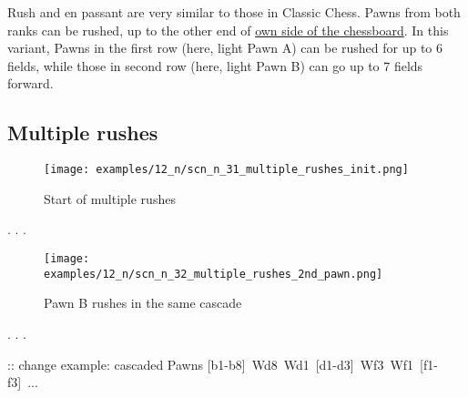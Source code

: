 Rush and en passant are very similar to those in Classic Chess.\newline
\indent
Pawns from both ranks can be rushed, up to the other end of
\hyperref[sec:Definitions/Chessboard sides, navigation]{own side of the chessboard}.\newline
\indent
In this variant, Pawns in the first row (here, light Pawn A) can be rushed for up
to 6 fields, while those in second row (here, light Pawn B) can go up to 7 fields
forward.

\clearpage %

\subsection*{Multiple rushes}
\label{sec:Nineteen/Rush, en passant/Multiple rushes}

\vspace*{-1.4\baselineskip}
\noindent
\begin{figure}[!h]
\texttt{[image: examples/12\_n/scn\_n\_31\_multiple\_rushes\_init.png]}
\vspace*{-1.4\baselineskip}
\caption{Start of multiple rushes}
\label{fig:scn_n_31_multiple_rushes_init}
\end{figure}

\vspace*{-0.5\baselineskip}
. . .

\clearpage %

\vspace*{-2.1\baselineskip}
\noindent
\begin{figure}[!h]
\texttt{[image: examples/12\_n/scn\_n\_32\_multiple\_rushes\_2nd\_pawn.png]}
\vspace*{-1.4\baselineskip}
\caption{Pawn B rushes in the same cascade}
\label{fig:scn_n_32_multiple_rushes_2nd_pawn}
\end{figure}

\vspace*{-0.5\baselineskip}
. . .

\TODO :: change example: cascaded Pawns [b1-b8]~Wd8~Wd1~[d1-d3]~Wf3~Wf1~[f1-f3]~...

\clearpage %

